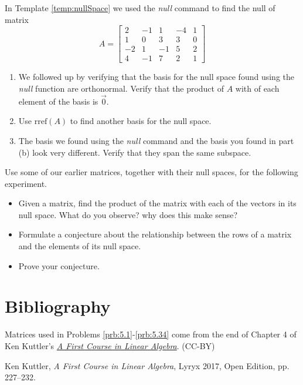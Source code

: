 \documentclass{ximera}
\begin{document}

\begin{problem}\label{prob_oct_Rn1}
    In Template \ref{temp:nullSpace} we used the \emph{null} command to find the null of matrix $$A=\begin{bmatrix}2&-1&1&-4&1\\1&0&3&3&0\\-2&1&-1&5&2\\4&-1&7&2&1\end{bmatrix}$$ 

    \begin{enumerate}
        \item We followed up by verifying that the basis for the null space found using the \emph{null} function are orthonormal.  Verify that the product of $A$ with of each element of the basis is $\vec{0}$.
        \item Use $\text{rref}(A)$ to find another basis for the null space.  
        \item The basis we found using the \emph{null} command and the basis you found in part (b) look very different.  Verify that they span the same subspace.
    \end{enumerate}
\end{problem}

\begin{problem}\label{prob_oct_Rn2}
    Use some of our earlier matrices, together with their null spaces, for the following experiment.
    \begin{itemize}
        \item Given a matrix, find the product of the matrix with each of the vectors in its null space.  What do you observe?  why does this make sense?
        \item Formulate a conjecture about the relationship between the rows of a matrix and the elements of its null space.
        \item Prove your conjecture.
    \end{itemize}
\end{problem}

\section*{Bibliography}
Matrices used in Problems \ref{prb:5.1}-\ref{prb:5.34} come from the end of Chapter 4 of Ken Kuttler's \href{https://open.umn.edu/opentextbooks/textbooks/a-first-course-in-linear-algebra-2017}{\it A First Course in Linear Algebra}. (CC-BY)

Ken Kuttler, {\it  A First Course in Linear Algebra}, Lyryx 2017, Open Edition, pp. 227--232.  
\end{document}

